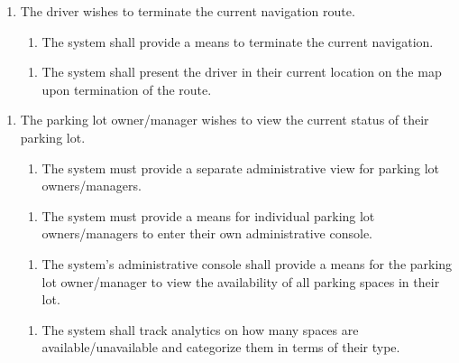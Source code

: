 \documentclass[12pt,letterpaper]{article}
\newcounter{businesseventnum}
\newcounter{funcreqnum}
\begin{document}
\begin{enumerate}[{BE}\thebusinesseventnum.] 
\item The driver wishes to terminate the current navigation route.
\begin{enumerate}[{FR}\thefuncreqnum.] 
    \item The system shall provide a means to terminate the current navigation.
\end{enumerate}
\begin{enumerate}[{FR}\thefuncreqnum.] 
    \item The system shall present the driver in their current location on the map upon termination of the route.
\end{enumerate}
\end{enumerate}

\begin{enumerate}[{BE}\thebusinesseventnum.] 
\item The parking lot owner/manager wishes to view the current status of their parking lot.
\begin{enumerate}[{FR}\thefuncreqnum.] 
    \item The system must provide a separate administrative view for parking lot owners/managers.
\end{enumerate}
\begin{enumerate}[{FR}\thefuncreqnum.] 
    \item The system must provide a means for individual parking lot owners/managers to enter their own administrative console.
\end{enumerate}
\begin{enumerate}[{FR}\thefuncreqnum.] 
    \item The system's administrative console shall provide a means for the parking lot owner/manager to view the availability of all parking spaces in their lot.
\end{enumerate}
\begin{enumerate}[{FR}\thefuncreqnum.] 
    \item The system shall track analytics on how many spaces are available/unavailable and categorize them in terms of their type.
\end{enumerate}
\end{enumerate}
\end{document}
